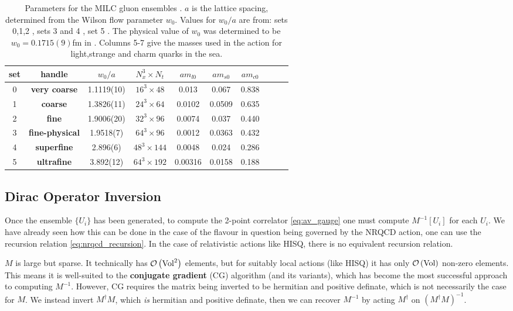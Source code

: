 \begin{table*}[t]
  \begin{center}
    \begin{tabular}{c c c c c c c c c c}
      \hline
      set & handle & $w_0/a$  & $N_x^3\times N_t$ & $am_{l0}$ & $am_{s0}$ & $am_{c0}$  \\ [0.5ex]
      \hline
      0 & \bf{very coarse} & 1.1119(10) & $16^3\times48$ & 0.013 & 0.067 & 0.838 \\ [1ex]
      1 & \bf{coarse} & 1.3826(11) & $24^3\times64$ & 0.0102 & 0.0509 & 0.635 \\ [1ex]
      2 & \bf{fine} & 1.9006(20) & $32^3\times96$ & 0.0074 & 0.037 & 0.440 \\ [1ex]
      3 & \bf{fine-physical} & 1.9518(7) & $64^3\times96$ & 0.0012 & 0.0363 & 0.432 \\ [1ex]
      4 & \bf{superfine} & 2.896(6) & $48^3\times144$ & 0.0048 & 0.024 & 0.286 \\ [1ex]
      5 & \bf{ultrafine} & 3.892(12) &  $64^3\times192$ & 0.00316 & 0.0158 & 0.188  \\ [1ex]
      \hline
    \end{tabular}
  \end{center}
  \caption{Parameters for the MILC gluon ensembles \cite{Bazavov:2010ru,Bazavov:2012xda}. $a$ is the lattice spacing, determined from the Wilson flow parameter $w_0$. Values for $w_0/a$ are from: sets 0,1,2 \cite{Chakraborty:2016mwy}, sets 3 and 4 \cite{Chakraborty:2014aca}, set 5 \cite{mcneile:private}. The physical value of $w_0$ was determined to be $w_0=0.1715(9)$fm in \cite{Dowdall:2013rya}. Columns 5-7 give the masses used in the action for light,strange and charm quarks in the sea. \label{tab:ensembles}}
\end{table*}


\subsection{Dirac Operator Inversion}
\label{sec:inversions}

Once the ensemble $\{U_i\}$ has been generated, to compute the 2-point correlator \eqref{eq:av_gauge} one must compute $M^{-1}[U_i]$ for each $U_i$. We have already seen how this can be done in the case of the flavour in question being governed by the NRQCD action, one can use the recursion relation \eqref{eq:nrqcd_recursion}. In the case of relativistic actions like HISQ, there is no equivalent recursion relation.

$M$ is large but sparse. It technically has $\mathcal{O}\left( \text{Vol}^2 \right)$ elements, but for suitably local actions (like HISQ) it has only $\mathcal{O}\left( \text{Vol} \right)$ non-zero elements. This means it is well-suited to the {\bf{conjugate gradient}} (CG) algorithm \cite{Hestenes&Stiefel:1952} (and its variants), which has become the most successful approach to computing $M^{-1}$. However, CG requires the matrix being inverted to be hermitian and positive definate, which is not necessarily the case for $M$. We instead invert $M^{\dagger}M$, which {\it{is}} hermitian and positive definate, then we can recover $M^{-1}$ by acting $M^{\dagger}$ on $(M^{\dagger}M)^{-1}$.

